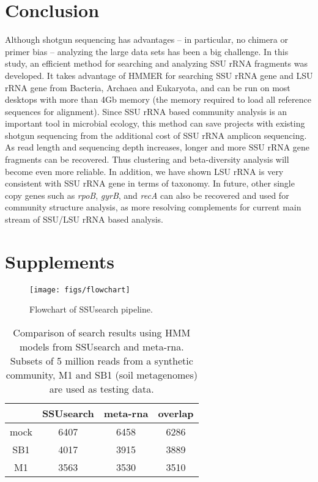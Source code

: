 \documentclass[12pt]{article}
\begin{document}
\section{Conclusion}

Although shotgun sequencing has advantages -- in particular, no
chimera or primer bias -- analyzing the large data sets has been a big
challenge. In this study, an efficient method for searching and
analyzing SSU rRNA fragments was developed. It takes advantage of
HMMER for searching SSU rRNA gene and LSU rRNA gene from Bacteria,
Archaea and Eukaryota, and can be run on most desktops with more than
4Gb memory (the memory required to load all reference sequences for
alignment). Since SSU rRNA based community analysis is an important
tool in microbial ecology, this method can save projects with existing 
shotgun sequencing from the additional cost of SSU rRNA amplicon
sequencing. As read length and sequencing depth increases, longer and
more SSU rRNA gene fragments can be recovered. Thus clustering and
beta-diversity analysis will become even more reliable. In addition,
we have shown LSU rRNA is very consistent with SSU rRNA gene in terms
of taxonomy. In future, other single copy genes such as {\em rpoB},
{\em gyrB}, and {\em recA} can also be recovered and used for
community structure analysis, as more resolving complements for
current main stream of SSU/LSU rRNA based analysis.




\section{Supplements}


\begin{figure}[tbph!]
  \centering
  \texttt{[image: figs/flowchart]}
  \caption[Flowchart of SSUsearch pipeline]{Flowchart of SSUsearch pipeline.}
  \label{fig:flowchart}
\end{figure}


\begin{table}[tbph!]

 \caption{Comparison of search results using HMM models from SSUsearch
 and meta-rna. Subsets of 5 million reads from a synthetic community,
 M1 and SB1 (soil metagenomes) are used as testing data.}

\label{tab:hmm_comparison}
\begin{tabular}{cccc}
\toprule
     & SSUsearch & meta-rna & overlap \\
\midrule
mock & 6407      & 6458     & 6286 \\
SB1  & 4017      & 3915     & 3889 \\
M1   & 3563      & 3530     & 3510 \\
\bottomrule
\end{tabular}
\end{table}
\end{document}
